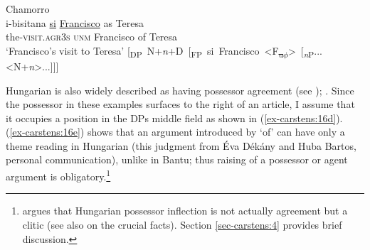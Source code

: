 \documentclass[output=paper
,modfonts
,nonflat]{langsci/langscibook}
\begin{document}
\begin{exe}
	\ex Chamorro \label{ex-carstens:15}
	\xlist
	\ex \citep[127]{Chung1982}\label{ex-carstens:15a}\\
	\gll i-bisitana       \uline{si} \uline{Francisco}   as Teresa \\
	the-\textsc{visit.agr3s}     \textsc{unm} Francisco           of Teresa\\
	\glt `Francisco's visit to Teresa'  	
	\ex \label{ex-carstens:15b} \mbox{[\textsubscript{DP} N+\textit{n}+D [\textsubscript{FP} si Francisco  <F\textsubscript{\sout{u}}\textsubscript{\sout{$\phi$}}> [\textsubscript{\textit{n}P}...<N+\textit{n}>...]]]}
	\endxlist
\end{exe}
Hungarian is also widely described as having possessor agreement (see \citealt{Szabolcsi1983, Szabolcsi1994}); . Since the possessor in these examples surfaces to the right of an article, I assume that it occupies a position in the DP\textquotesingle s middle field as shown in (\ref{ex-carstens:16d}). (\ref{ex-carstens:16e}) shows that an argument introduced by `of' can have only a theme reading in Hungarian (this judgment from Éva Dékány and Huba Bartos, personal communication), unlike in Bantu; thus raising of a possessor or agent argument is obligatory.\footnote{\label{note9} argues that Hungarian possessor inflection is not actually agreement but a clitic (see also \citealt{Den_Dikken1999,Bartos1999,Kiss2002} on the crucial facts). Section \ref{sec-carstens:4} provides brief discussion.} 
\end{document}
